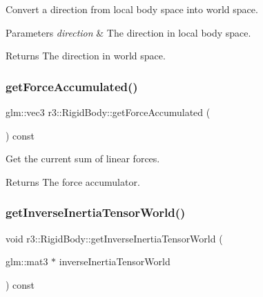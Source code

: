 Convert a direction from local body space into world space. 


\begin{DoxyParams}{Parameters}
{\em direction} & The direction in local body space. \\
\hline
\end{DoxyParams}
\begin{DoxyReturn}{Returns}
The direction in world space. 
\end{DoxyReturn}
\mbox{\label{classr3_1_1_rigid_body_ae15bce9cc4aa2db577bdfb61464d26c0}} 
\subsubsection{\texorpdfstring{get\+Force\+Accumulated()}{getForceAccumulated()}}
{\footnotesize\ttfamily glm\+::vec3 r3\+::\+Rigid\+Body\+::get\+Force\+Accumulated (\begin{DoxyParamCaption}{ }\end{DoxyParamCaption}) const}



Get the current sum of linear forces. 

\begin{DoxyReturn}{Returns}
The force accumulator. 
\end{DoxyReturn}
\mbox{\label{classr3_1_1_rigid_body_ae9057a0acbb7dd552a23557ed773b3d5}} 
\subsubsection{\texorpdfstring{get\+Inverse\+Inertia\+Tensor\+World()}{getInverseInertiaTensorWorld()}\hspace{0.1cm}{\footnotesize\ttfamily [1/2]}}
{\footnotesize\ttfamily void r3\+::\+Rigid\+Body\+::get\+Inverse\+Inertia\+Tensor\+World (\begin{DoxyParamCaption}\item[{glm\+::mat3 $\ast$}]{inverse\+Inertia\+Tensor\+World }\end{DoxyParamCaption}) const}



